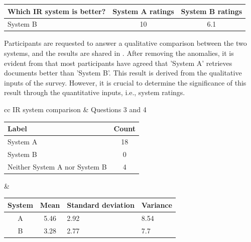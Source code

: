  \begin{center}
	\label{tab:question_234_anamoly}
	\begin{tabularx}{.8\textwidth}{|Y|c|c|}
		\hline
		Which IR system is better? & System A ratings & System B ratings \\
		\hline
		System B & 10 & 6.1 \\
		\hline
	\end{tabularx}
\end{center} 

Participants are requested to answer a qualitative comparison between the two systems, and the results are shared in . After removing the anomalies, it is evident from  that most participants have agreed that 'System A' retrieves documents better than 'System B'. This result is derived from the qualitative inputs of the survey. However, it is crucial to determine the significance of this result through the quantitative inputs, i.e., system ratings.

\begin{center}
	\label{tab:question_2_results}
	\begin{tabular}{ cc }   %
		IR system comparison  & Questions 3 and 4 \\  
\begin{tabularx}{.4\textwidth}{|Y|c|}
	\hline
	Label & Count \\
	\hline
	System A & 18 \\
	\hline
	System B & 0 \\
	\hline
	Neither System A nor System B & 4 \\
	\hline
	
\end{tabularx} &  %
		\begin{tabularx}{.45\textwidth}{|c|c|Y|Y|}
			\hline
			System & Mean & Standard deviation & Variance \\
			\hline
			 A & 5.46 & 2.92  & 8.54 \\
			\hline
			 B & 3.28 & 2.77 & 7.7 \\
			\hline

		\end{tabularx} \\
	\end{tabular}
\end{center}

